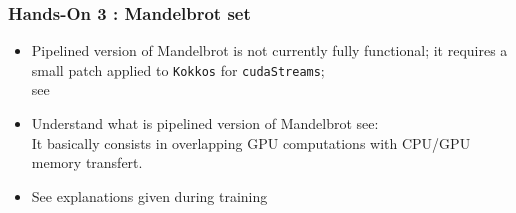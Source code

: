 \begin{frame}[fragile=singleslide]
  \frametitle{Hands-On 3 : Mandelbrot set}

  \begin{itemize}
  \item Pipelined version of Mandelbrot is not currently fully functional; it requires a small patch applied to \texttt{Kokkos} for \texttt{cudaStreams};\\
    see 
  \item Understand what is pipelined version of Mandelbrot see:
    {\scriptsize {}}\\
    It basically consists in overlapping GPU computations with CPU/GPU memory transfert.
  \item See explanations given during training
  \end{itemize}

\end{frame}
